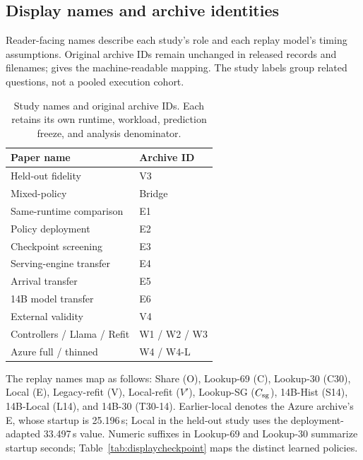 \subsection{Display names and archive identities}
Reader-facing names describe each study's role and each replay model's timing
assumptions. Original archive IDs remain unchanged in released records and
filenames;  gives the machine-readable mapping.
The study labels group related questions, not a pooled execution cohort.
\begin{table}[t]
\centering\small
\caption{Study names and original archive IDs. Each retains its own runtime,
workload, prediction freeze, and analysis denominator.}
\par\vspace{4pt}
\begin{tabular*}{\linewidth}{@{\extracolsep{\fill}}ll@{}}
\toprule
Paper name & Archive ID\\
\midrule
Held-out fidelity & V3\\
Mixed-policy & Bridge\\
Same-runtime comparison & E1\\
Policy deployment & E2\\
Checkpoint screening & E3\\
Serving-engine transfer & E4\\
Arrival transfer & E5\\
14B model transfer & E6\\
External validity & V4\\
Controllers / Llama / Refit & W1 / W2 / W3\\
Azure full / thinned & W4 / W4-L\\
\bottomrule
\end{tabular*}
\end{table}

The replay names map as follows: Share (O), Lookup-69 (C), Lookup-30 (C30),
Local (E), Legacy-refit (V), Local-refit ($V'$), Lookup-SG ($C_{\rm sg}$),
14B-Hist (S14), 14B-Local (L14), and 14B-30 (T30-14).
Earlier-local denotes the Azure archive's E, whose startup is 25.196\,s;
Local in the held-out study uses the deployment-adapted 33.497\,s value.
Numeric suffixes in Lookup-69 and Lookup-30 summarize startup seconds;
Table~\ref{tab:displaycheckpoint} maps the distinct learned policies.


